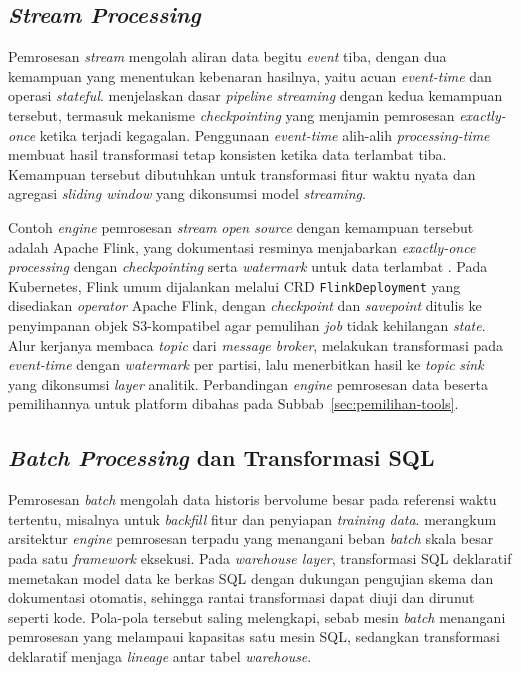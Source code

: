 \subsection{\textit{Stream Processing}}
\label{subsec:flink}

Pemrosesan \textit{stream} mengolah aliran data begitu \textit{event} tiba, dengan dua kemampuan yang menentukan kebenaran hasilnya, yaitu acuan \textit{event-time} dan operasi \textit{stateful}. \textcite{carbone2015apache} menjelaskan dasar \textit{pipeline} \textit{streaming} dengan kedua kemampuan tersebut, termasuk mekanisme \textit{checkpointing} yang menjamin pemrosesan \textit{exactly-once} ketika terjadi kegagalan. Penggunaan \textit{event-time} alih-alih \textit{processing-time} membuat hasil transformasi tetap konsisten ketika data terlambat tiba. Kemampuan tersebut dibutuhkan untuk transformasi fitur waktu nyata dan agregasi \textit{sliding window} yang dikonsumsi model \textit{streaming}.

Contoh \textit{engine} pemrosesan \textit{stream} \textit{open source} dengan kemampuan tersebut adalah Apache Flink, yang dokumentasi resminya menjabarkan \textit{exactly-once processing} dengan \textit{checkpointing} serta \textit{watermark} untuk data terlambat \autocite{apacheflink2024}. Pada Kubernetes, Flink umum dijalankan melalui CRD \texttt{FlinkDeployment} yang disediakan \textit{operator} Apache Flink, dengan \textit{checkpoint} dan \textit{savepoint} ditulis ke penyimpanan objek S3-kompatibel agar pemulihan \textit{job} tidak kehilangan \textit{state}. Alur kerjanya membaca \textit{topic} dari \textit{message broker}, melakukan transformasi pada \textit{event-time} dengan \textit{watermark} per partisi, lalu menerbitkan hasil ke \textit{topic} \textit{sink} yang dikonsumsi \textit{layer} analitik. Perbandingan \textit{engine} pemrosesan data beserta pemilihannya untuk platform dibahas pada Subbab~\ref{sec:pemilihan-tools}.

\subsection{\textit{Batch Processing} dan Transformasi SQL}
\label{subsec:spark}

Pemrosesan \textit{batch} mengolah data historis bervolume besar pada referensi waktu tertentu, misalnya untuk \textit{backfill} fitur dan penyiapan \textit{training data}. \textcite{zaharia2016spark} merangkum arsitektur \textit{engine} pemrosesan terpadu yang menangani beban \textit{batch} skala besar pada satu \textit{framework} eksekusi. Pada \textit{warehouse layer}, transformasi SQL deklaratif memetakan model data ke berkas SQL dengan dukungan pengujian skema dan dokumentasi otomatis, sehingga rantai transformasi dapat diuji dan dirunut seperti kode. Pola-pola tersebut saling melengkapi, sebab mesin \textit{batch} menangani pemrosesan yang melampaui kapasitas satu mesin SQL, sedangkan transformasi deklaratif menjaga \textit{lineage} antar tabel \textit{warehouse}.

